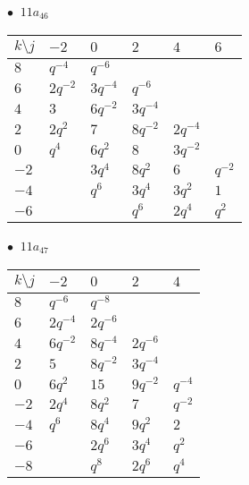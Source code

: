 \begin{minipage}{\linewidth}
$\bullet\ $ $11a_{46}$ \vspace{0.5em} \\
\begin{tabular}{l|lllll}
$k \setminus j$ & $-2$ & $0$ & $2$ & $4$ & $6$ \\
\hline
$8$ & $q^{-4}$ & $q^{-6}$ &  &  &  \\
$6$ & $2q^{-2}$ & $3q^{-4}$ & $q^{-6}$ &  &  \\
$4$ & $3$ & $6q^{-2}$ & $3q^{-4}$ &  &  \\
$2$ & $2q^{2}$ & $7$ & $8q^{-2}$ & $2q^{-4}$ &  \\
$0$ & $q^{4}$ & $6q^{2}$ & $8$ & $3q^{-2}$ &  \\
$-2$ &  & $3q^{4}$ & $8q^{2}$ & $6$ & $q^{-2}$ \\
$-4$ &  & $q^{6}$ & $3q^{4}$ & $3q^{2}$ & $1$ \\
$-6$ &  &  & $q^{6}$ & $2q^{4}$ & $q^{2}$ \\
\end{tabular}
\vspace{2em}
\end{minipage}
%
\begin{minipage}{\linewidth}
$\bullet\ $ $11a_{47}$ \vspace{0.5em} \\
\begin{tabular}{l|llll}
$k \setminus j$ & $-2$ & $0$ & $2$ & $4$ \\
\hline
$8$ & $q^{-6}$ & $q^{-8}$ &  &  \\
$6$ & $2q^{-4}$ & $2q^{-6}$ &  &  \\
$4$ & $6q^{-2}$ & $8q^{-4}$ & $2q^{-6}$ &  \\
$2$ & $5$ & $8q^{-2}$ & $3q^{-4}$ &  \\
$0$ & $6q^{2}$ & $15$ & $9q^{-2}$ & $q^{-4}$ \\
$-2$ & $2q^{4}$ & $8q^{2}$ & $7$ & $q^{-2}$ \\
$-4$ & $q^{6}$ & $8q^{4}$ & $9q^{2}$ & $2$ \\
$-6$ &  & $2q^{6}$ & $3q^{4}$ & $q^{2}$ \\
$-8$ &  & $q^{8}$ & $2q^{6}$ & $q^{4}$ \\
\end{tabular}
\vspace{2em}
\end{minipage}
%
